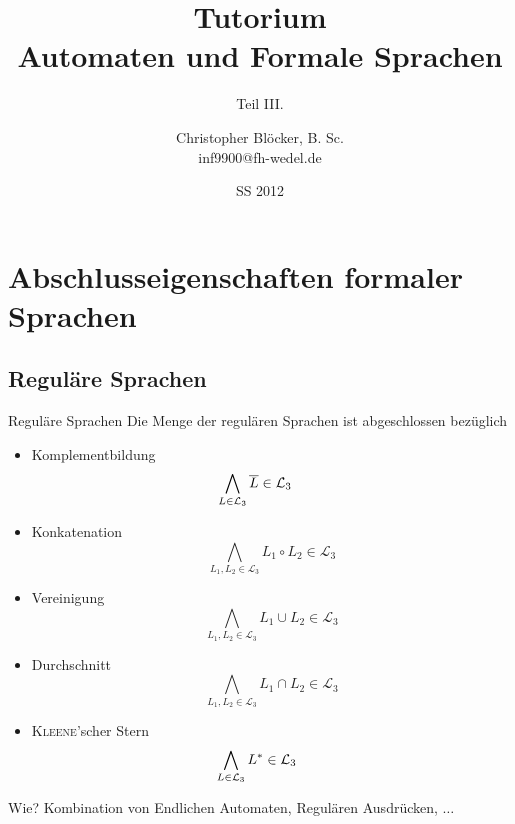 \documentclass[]{beamer}
\author[Christopher Blöcker, B. Sc.]{Christopher Blöcker, B. Sc.\\ inf9900@fh-wedel.de}
\title[AFS Tutorium]{Tutorium\\Automaten und Formale Sprachen}
\date{SS 2012}
\subtitle{Teil III.}
\begin{document}
\begin{frame}
  \titlepage
\end{frame}

\section{Abschlusseigenschaften formaler Sprachen}
\subsection{Reguläre Sprachen}
\begin{frame}[squeeze]{}
  \vspace*{-0.35em}
  \begin{block}{Reguläre Sprachen}
    Die Menge der regulären Sprachen ist abgeschlossen bezüglich
    \begin{itemize}
      \item Komplementbildung
            \vspace*{-0.75em}
            \[\bigwedge_{L \in \mathcal{L}_3} \overline{L} \in \mathcal{L}_3 \hspace*{2.3em}\]
      \item Konkatenation
            \vspace*{-0.75em}
            \[\bigwedge_{L_1, L_2 \in \mathcal{L}_3} L_1 \circ L_2 \in \mathcal{L}_3\]
      \item Vereinigung
            \vspace*{-0.75em}
            \[\bigwedge_{L_1, L_2 \in \mathcal{L}_3} L_1 \cup L_2 \in \mathcal{L}_3\]
      \item Durchschnitt
            \vspace*{-0.75em}
            \[\bigwedge_{L_1, L_2 \in \mathcal{L}_3} L_1 \cap L_2 \in \mathcal{L}_3\]
      \item \textsc{Kleene}'scher Stern
            \vspace*{-0.75em}
            \[\bigwedge_{L \in \mathcal{L}_3} L^* \in \mathcal{L}_3 \hspace*{2.2em}\]
    \end{itemize}
  \end{block}
  
  \pause
  \vspace*{-0.5em}
  
  \begin{exampleblock}{Wie?}
    \pause
    Kombination von Endlichen Automaten, Regulären Ausdrücken, $\ldots$
  \end{exampleblock}
\end{frame}
\end{document}
